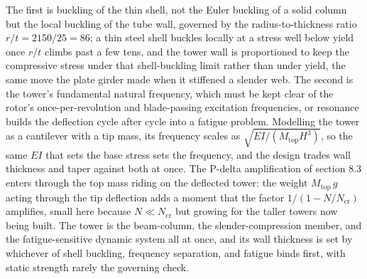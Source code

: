 The first is buckling of the thin shell, not the Euler buckling of a
solid column but the local buckling of the tube wall, governed by the
radius-to-thickness ratio $r/t = 2150/25 = 86$; a thin steel shell
buckles locally at a stress well below yield once $r/t$ climbs past a few
tens, and the tower wall is proportioned to keep the compressive stress
under that shell-buckling limit rather than under yield, the same move
the plate girder made when it stiffened a slender web. The second is the
tower's fundamental natural frequency, which must be kept clear of the
rotor's once-per-revolution and blade-passing excitation frequencies, or
resonance builds the deflection cycle after cycle into a fatigue
problem. Modelling the tower as a cantilever with a tip mass, its
frequency scales as $\sqrt{EI/(M_{\text{top}}H^3)}$, so the same $EI$
that sets the base stress sets the frequency, and the design trades wall
thickness and taper against both at once. The P-delta amplification of
section 8.3 enters through the top mass riding on the deflected tower:
the weight $M_{\text{top}}\,g$ acting through the tip deflection adds a
moment that the factor $1/(1 - N/N_{\text{cr}})$ amplifies, small here
because $N \ll N_{\text{cr}}$ but growing for the taller towers now being
built. The tower is the beam-column, the slender-compression member, and
the fatigue-sensitive dynamic system all at once, and its wall thickness
is set by whichever of shell buckling, frequency separation, and fatigue
binds first, with static strength rarely the governing check.

